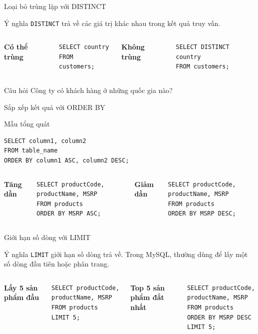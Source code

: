 \documentclass[aspectratio=169,11pt]{beamer}
\newcommand{\kw}[1]{\textcolor{sqlblue}{\texttt{#1}}}
\newcommand{\minihead}[1]{\vspace{2pt}\textbf{#1}\vspace{2pt}}
\begin{document}
\begin{frame}[fragile]{Loại bỏ trùng lặp với DISTINCT}
\begin{block}{Ý nghĩa}
\kw{DISTINCT} trả về các giá trị khác nhau trong kết quả truy vấn.
\end{block}
\begin{columns}[T]
\minihead{Có thể trùng}
\begin{lstlisting}
SELECT country
FROM customers;
\end{lstlisting}
\minihead{Không trùng}
\begin{lstlisting}
SELECT DISTINCT country
FROM customers;
\end{lstlisting}
\end{columns}
\begin{exampleblock}{Câu hỏi}
Công ty có khách hàng ở những quốc gia nào?
\end{exampleblock}
\end{frame}

\begin{frame}[fragile]{Sắp xếp kết quả với ORDER BY}
\begin{block}{Mẫu tổng quát}
\begin{lstlisting}
SELECT column1, column2
FROM table_name
ORDER BY column1 ASC, column2 DESC;
\end{lstlisting}
\end{block}
\begin{columns}[T]
\minihead{Tăng dần}
\begin{lstlisting}
SELECT productCode, productName, MSRP
FROM products
ORDER BY MSRP ASC;
\end{lstlisting}
\minihead{Giảm dần}
\begin{lstlisting}
SELECT productCode, productName, MSRP
FROM products
ORDER BY MSRP DESC;
\end{lstlisting}
\end{columns}
\end{frame}

\begin{frame}[fragile]{Giới hạn số dòng với LIMIT}
\begin{block}{Ý nghĩa}
\kw{LIMIT} giới hạn số dòng trả về. Trong MySQL, thường dùng để lấy một số dòng đầu tiên hoặc phân trang.
\end{block}
\begin{columns}[T]
\minihead{Lấy 5 sản phẩm đầu}
\begin{lstlisting}
SELECT productCode, productName, MSRP
FROM products
LIMIT 5;
\end{lstlisting}
\minihead{Top 5 sản phẩm đắt nhất}
\begin{lstlisting}
SELECT productCode, productName, MSRP
FROM products
ORDER BY MSRP DESC
LIMIT 5;
\end{lstlisting}
\end{columns}
\end{frame}
\end{document}
